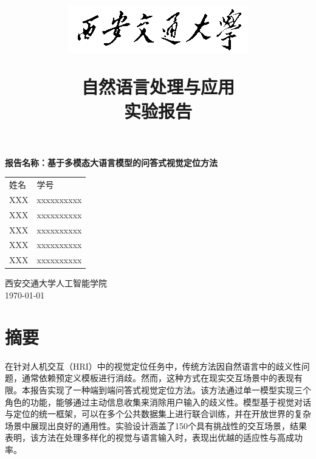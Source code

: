 \documentclass[12pt, a4paper, oneside]{ctexart}
\numberwithin{equation}{section}  %
\begin{document}
\title{
\begin{figure}[htbp]
  \centering
  \includegraphics[width=0.8\linewidth]{校徽/XJTU_logo.png}
\end{figure}
{\bfseries{} 自然语言处理与应用}\\[2ex]
{\bfseries{} 实验报告}\\[4ex]
}
\author{
}
\date{} %

\maketitle %


{
\vspace{-2cm}
\begin{center}
\bf
\noindent 报告名称：基于多模态大语言模型的问答式视觉定位方法
\end{center}

\begin{table}[!h]
\renewcommand{\arraystretch}{1.5}
\centering
\begin{tabularx}{0.6\textwidth} { 
  >{\centering\arraybackslash}X 
  >{\centering\arraybackslash}X}
姓名&学号\\
XXX&xxxxxxxxxx\\
XXX&xxxxxxxxxx\\
XXX&xxxxxxxxxx\\
XXX&xxxxxxxxxx\\
XXX&xxxxxxxxxx\\
\end{tabularx}
\end{table}
}
\vfill
\begin{center}
西安交通大学\quad 人工智能学院\\[2ex]
\today %
\end{center}

\newpage
\pagestyle{fancy}
\fancyhf{} %
\fancyfoot[C]{\thepage} %
\renewcommand{\headrulewidth}{0pt} %
\renewcommand{\footrulewidth}{0pt} %
\setcounter{page}{1} %
\clearpage

\section*{摘要} %
在针对人机交互（HRI）中的视觉定位任务中，传统方法因自然语言中的歧义性问题，通常依赖预定义模板进行消歧。然而，这种方式在现实交互场景中的表现有限。本报告实现了一种端到端问答式视觉定位方法。该方法通过单一模型实现三个角色的功能，能够通过主动信息收集来消除用户输入的歧义性。模型基于视觉对话与定位的统一框架，可以在多个公共数据集上进行联合训练，并在开放世界的复杂场景中展现出良好的通用性。实验设计涵盖了150个具有挑战性的交互场景，结果表明，该方法在处理多样化的视觉与语言输入时，表现出优越的适应性与高成功率。
\end{document}
